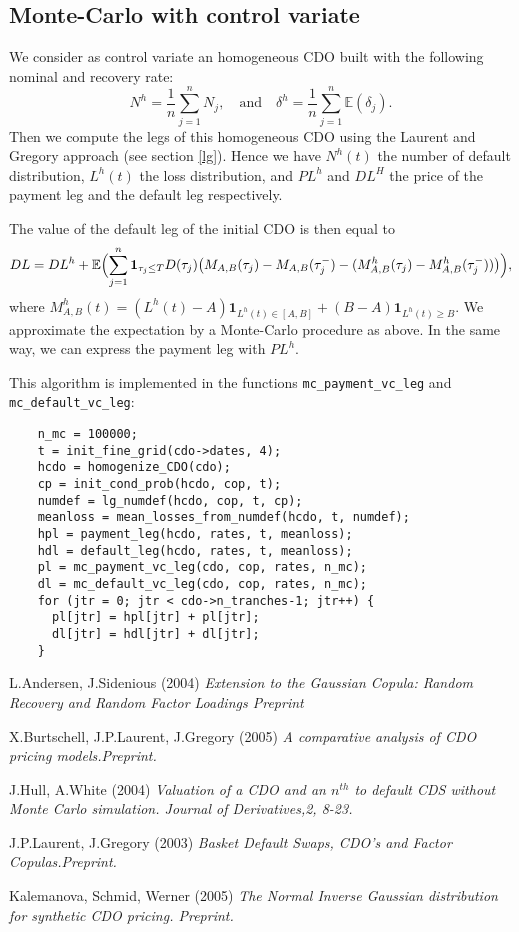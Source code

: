 \documentclass[10pt, a4paper]{article}
\newcommand{\code}[1]{{\upshape \lstinline[language=c]{#1}}}
\newcommand{\E}{\mathbb{E}}
\begin{document}
\subsection{Monte-Carlo with control variate}
We consider as control variate an homogeneous CDO built with the following nominal and recovery rate: 
\begin{equation*}
    N^h = \frac{1}{n} \sum_{j=1}^n N_j, \quad \text{and} \quad \delta^h = \frac{1}{n} \sum_{j=1}^n \E(\delta_j).
\end{equation*}
Then we compute the legs of this homogeneous CDO using the Laurent and Gregory approach (see section \ref{lg}). Hence we have $N^h(t)$ the number of default distribution, $L^h(t)$ the loss distribution, and $PL^h$ and $DL^H$ the price of the payment leg and the default leg respectively. 

The value of the default leg of the initial CDO is then equal to 
\begin{equation*}
    DL = DL^h + \E \Bigl( \sum_{j=1}^n \mathbf{1}_{\tau_j \le T} D(\tau_j) \bigl(M_{A,B}(\tau_j) - M_{A,B}(\tau_j^-) - (M^h_{A,B}(\tau_j) - M^h_{A,B}(\tau_j^-)) \bigr) \Bigr),
\end{equation*}
where $M^h_{A,B}(t) = (L^h(t) - A) \mathbf{1}_{L^h(t) \in [A,B]} + (B-A) \mathbf{1}_{L^h(t) \ge B}$. 
We approximate the expectation by a Monte-Carlo procedure as above. In the same way, we can express the payment leg with $PL^h$. 

This algorithm is implemented in the functions \code{mc_payment_vc_leg} and \code{mc_default_vc_leg}: 
\begin{lstlisting}
    n_mc = 100000;
    t = init_fine_grid(cdo->dates, 4);
    hcdo = homogenize_CDO(cdo);
    cp = init_cond_prob(hcdo, cop, t);
    numdef = lg_numdef(hcdo, cop, t, cp);
    meanloss = mean_losses_from_numdef(hcdo, t, numdef);
    hpl = payment_leg(hcdo, rates, t, meanloss);
    hdl = default_leg(hcdo, rates, t, meanloss);
    pl = mc_payment_vc_leg(cdo, cop, rates, n_mc);
    dl = mc_default_vc_leg(cdo, cop, rates, n_mc);
    for (jtr = 0; jtr < cdo->n_tranches-1; jtr++) {
      pl[jtr] = hpl[jtr] + pl[jtr];
      dl[jtr] = hdl[jtr] + dl[jtr];
    }
\end{lstlisting}

\begin{thebibliography}{99}
 L.Andersen, J.Sidenious (2004) \it Extension to the Gaussian Copula: Random Recovery and Random Factor Loadings
\rm Preprint

X.Burtschell, J.P.Laurent, J.Gregory (2005) \it A comparative analysis of CDO pricing models.\rm Preprint. 

J.Hull, A.White (2004) \it Valuation of a CDO and an $n^{th}$ to default CDS without Monte Carlo simulation. \rm Journal of Derivatives,2, 8-23.

J.P.Laurent, J.Gregory (2003) \it  Basket Default Swaps, CDO's and Factor Copulas.\rm Preprint.

Kalemanova, Schmid, Werner (2005) \it The Normal Inverse Gaussian distribution for synthetic CDO pricing. \rm Preprint.

\end{thebibliography}
\end{document}
